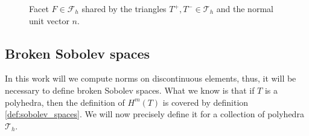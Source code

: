 \begin{figure}[!h]
\centering
{}

\caption{Facet $F \in \mathcal{F}_h $ shared by the triangles $T^{+}, T^{-} \in \mathcal{T}_{h} $ and the normal unit vector $n$.  }
    \label{fig:normal}
\end{figure}


\subsection{Broken Sobolev spaces}%
\label{sub:broken_sobolev_spaces}

In this work will we compute norms on discontinuous elements, thus, it will be necessary to define broken Sobolev spaces. What we know is that if $T$ is a polyhedra, then the definition of $H^{m}( T)$ is covered by definition
\ref{def:sobolev_spaces}. We will now precisely define it for a collection of polyhedra $\mathcal{T}_{h}$.

